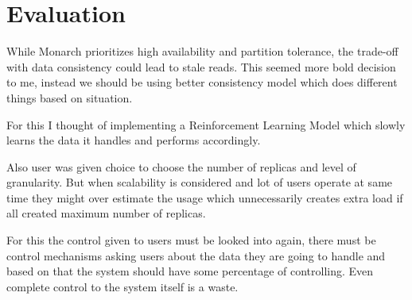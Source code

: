 


\section{Evaluation}

While Monarch prioritizes high availability and partition tolerance, the trade-off with data consistency could lead to stale reads. This seemed more bold decision to me, instead we should be using better consistency model which does different things based on situation.

For this I thought of implementing a Reinforcement Learning Model which slowly learns the data it handles and performs accordingly.

Also user was given choice to choose the number of replicas and level of granularity. But when scalability is considered and lot of users operate at same time they might over estimate the usage which unnecessarily creates extra load if all created maximum number of replicas.

For this the control given to users must be looked into again, there must be control mechanisms asking users about the data they are going to handle and based on that the system should have some percentage of controlling. Even complete control to the system itself is a waste.

